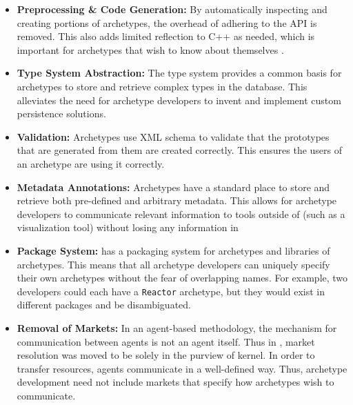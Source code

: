 \begin{itemize}
    \item \textbf{Preprocessing \& Code Generation:}  By automatically 
        inspecting and creating portions of archetypes, the overhead
        of adhering to the \cyclus \gls{API} is removed. This also 
        adds limited reflection to C++ as needed, which is important 
        for archetypes that wish to know about themselves .

    \item \textbf{Type System Abstraction:} The \Cyclus type system 
        provides a common basis for archetypes to store and retrieve 
        complex types in the database. This alleviates the need for archetype
        developers to invent and implement custom persistence solutions.

    \item \textbf{Validation:} Archetypes use \gls{XML} schema to validate that 
        the prototypes that are generated from them are created correctly.
        This ensures the users of an archetype are using it correctly.

    \item \textbf{Metadata Annotations:} Archetypes have a standard place to 
        store and retrieve both pre-defined and arbitrary metadata.
        This allows for archetype developers to communicate relevant information
        to tools outside of \cyclus (such as a visualization tool) without
        losing any information in 

    \item \textbf{Package System:} \Cyclus has a packaging system for archetypes and 
        libraries of archetypes. This means that all archetype developers can 
        uniquely specify their own archetypes without the fear of overlapping 
        names.  For example, two developers could each have a \texttt{Reactor}
        archetype, but they would exist in different packages and be 
        disambiguated.

    \item \textbf{Removal of Markets:} In an agent-based methodology, 
        the mechanism for communication between agents is not an agent itself.
        Thus in \cyclus, market resolution was moved to be solely in the purview 
        of kernel. In order to transfer resources, agents communicate 
        in a well-defined way. Thus, archetype development need not  
        include markets that specify how archetypes wish to communicate.  

\end{itemize}

